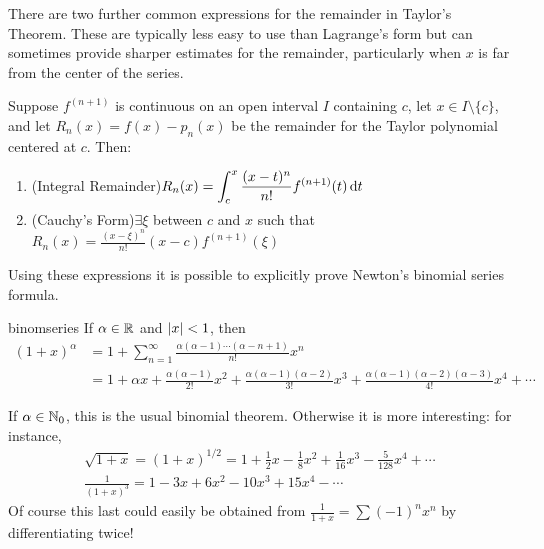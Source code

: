 


There are two further common expressions for the remainder in Taylor's Theorem. These are typically less easy to use than Lagrange's form but can sometimes provide sharper estimates for the remainder, particularly when $x$ is far from the center of the series.

\begin{cor}{}{}
	Suppose $f^{(n+1)}$ is continuous on an open interval $I$ containing $c$, let $x\in I\setminus\{c\}$, and let $R_n(x)=f(x)-p_n(x)$ be the remainder for the Taylor polynomial centered at $c$. Then:
	\begin{enumerate}
	  \item (Integral Remainder)\quad $\smash[b]{\displaystyle R_n(x)=\int_c^x\frac{(x-t)^n}{n!}f^{(n+1)}(t)\,{\mathrm{d} t}}$
		\item (Cauchy's Form)\quad $\exists\xi$ between $c$ and $x$ such that \
		$\displaystyle R_n(x)=\frac{(x-\xi)^{n}}{n!}(x-c)f^{(n+1)}(\xi)$
	\end{enumerate} 
\end{cor}

\goodbreak

Using these expressions it is possible to explicitly prove Newton's binomial series formula.

\begin{cor}{}{binomseries}
	If $\alpha\in\mathbb{R}$ and $\left| x\right|<1$, then
	\begin{align*}
		(1+x)^\alpha
		&=1+\sum_{n=1}^\infty\frac{\alpha(\alpha-1)\cdots(\alpha-n+1)}{n!}x^n\\
		&=1+\alpha x+\frac{\alpha(\alpha-1)}{2!}x^2 
		+\frac{\alpha(\alpha-1)(\alpha-2)}{3!}x^3 
		+\frac{\alpha(\alpha-1)(\alpha-2)(\alpha-3)}{4!}x^4 +\cdots
	\end{align*}
\end{cor}

If $\alpha\in\mathbb{N}_0$, this is the usual binomial theorem. Otherwise it is more interesting: for instance,
\begin{gather*}
	\sqrt{1+x}=(1+x)^{1/2}=1+\frac 12x-\frac 18x^2+\frac 1{16}x^3-\frac 5{128}x^4+\cdots\\
	\frac 1{(1+x)^3}=1-3x+6x^2-10x^3+15x^4-\cdots
\end{gather*}
Of course this last could easily be obtained from $\frac 1{1+x}=\sum (-1)^nx^n$ by differentiating twice!




